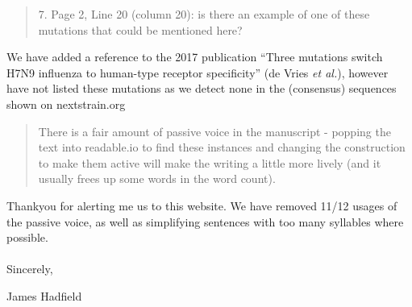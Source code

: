 \documentclass[12pt,a4paper]{article}
\begin{document}
\begin{quote}
7. Page 2, Line 20 (column 20): is there an example of one of these mutations that could be mentioned here?
\end{quote}
We have added a reference to the 2017 publication ``Three mutations switch H7N9 influenza to human-type receptor specificity'' (de Vries \textit{et al.}), however have not listed these mutations as we detect none in the (consensus) sequences shown on nextstrain.org

\begin{quote}
There is a fair amount of passive voice in the manuscript - popping the text into readable.io to find these instances and changing the construction to make them active will make the writing a little more lively (and it usually frees up some words in the word count).
\end{quote}
Thankyou for alerting me us to this website. We have removed 11/12 usages of the passive voice, as well as simplifying sentences with too many syllables where possible.

\paragraph{}
Sincerely,

James Hadfield
\end{document}
